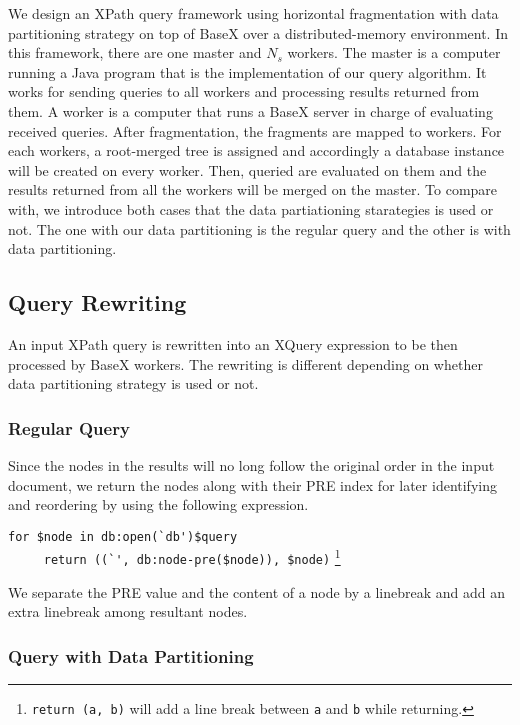 We design an XPath query framework using horizontal fragmentation with data
partitioning strategy on top of BaseX over a distributed-memory environment.  In
this framework, there are one master and $N_s$ workers. The master is a computer
running a Java program that is the implementation of our query algorithm. It
works for sending queries to all workers and processing results returned from
them. A worker is a computer that runs a BaseX server in charge of evaluating
received queries.  After fragmentation, the fragments are mapped to workers. For
each workers, a root-merged tree is assigned and accordingly a database instance
will be created on every worker. Then, queried are evaluated on them  and the
results returned from all the workers will be merged on the master.
To compare with, we introduce both cases that the data partiationing starategies
is used or not. The one with our data partitioning is the regular query and the
other is with data partitioning. 

\subsection{Query Rewriting}

An input XPath query is rewritten into an XQuery expression to be then processed
by BaseX workers. The rewriting is different depending on whether data
partitioning strategy is used or not.

\subsubsection{Regular Query}
\label{no-dps}

Since the nodes in the results will no long follow the original order in the
input document, we return the nodes along with their PRE index for later
identifying and reordering by using the following expression.

\verb|for $node in db:open(`db')$query|\\
\verb|     return ((`', db:node-pre($node)), $node)|
\footnote{\texttt{return (a, b)} will add a line break between \texttt{a} and
	\texttt{b} while returning.}

We separate the PRE value and the content of a node by a linebreak and add an
extra linebreak among resultant nodes.


\subsubsection{Query with Data Partitioning}

